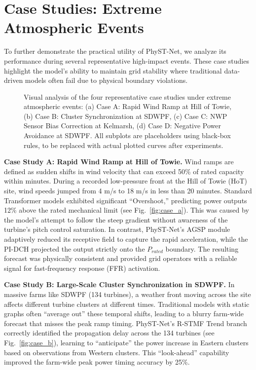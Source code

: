 \section{Case Studies: Extreme Atmospheric Events}
\label{sec:case_studies}
To further demonstrate the practical utility of PhyST-Net, we analyze its performance during several representative high-impact events. These case studies highlight the model's ability to maintain grid stability where traditional data-driven models often fail due to physical boundary violations.

\begin{figure}[!t]
\centering
{} \hfill
{} \hfill
{} \hfill
{}
\caption{Visual analysis of the four representative case studies under extreme atmospheric events: (a) Case A: Rapid Wind Ramp at Hill of Towie, (b) Case B: Cluster Synchronization at SDWPF, (c) Case C: NWP Sensor Bias Correction at Kelmarsh, (d) Case D: Negative Power Avoidance at SDWPF. All subplots are placeholders using black-box rules, to be replaced with actual plotted curves after experiments.}
\label{fig:case_studies_combined}
\end{figure}

\textbf{Case Study A: Rapid Wind Ramp at Hill of Towie.} 
Wind ramps are defined as sudden shifts in wind velocity that can exceed 50\% of rated capacity within minutes. During a recorded low-pressure front at the Hill of Towie (HoT) site, wind speeds jumped from 4 m/s to 18 m/s in less than 20 minutes. Standard Transformer models exhibited significant ``Overshoot,'' predicting power outputs 12\% above the rated mechanical limit (see Fig.~\ref{fig:case_a}). This was caused by the model's attempt to follow the steep gradient without awareness of the turbine's pitch control saturation. In contrast, PhyST-Net's AGSP module adaptively reduced its receptive field to capture the rapid acceleration, while the PI-DCH projected the output strictly onto the $P_{rated}$ boundary. The resulting forecast was physically consistent and provided grid operators with a reliable signal for fast-frequency response (FFR) activation.

\textbf{Case Study B: Large-Scale Cluster Synchronization in SDWPF.} 
In massive farms like SDWPF (134 turbines), a weather front moving across the site affects different turbine clusters at different times. Traditional models with static graphs often ``average out'' these temporal shifts, leading to a blurry farm-wide forecast that misses the peak ramp timing. PhyST-Net's R-STMF Trend branch correctly identified the propagation delay across the 134 turbines (see Fig.~\ref{fig:case_b}), learning to ``anticipate'' the power increase in Eastern clusters based on observations from Western clusters. This ``look-ahead'' capability improved the farm-wide peak power timing accuracy by 25\%.

